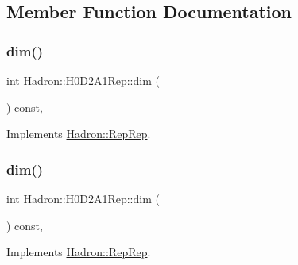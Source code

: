 \subsection{Member Function Documentation}
\mbox{\label{structHadron_1_1H0D2A1Rep_ab42f651512c7614de1f9eda51cfa51be}} 
\subsubsection{\texorpdfstring{dim()}{dim()}\hspace{0.1cm}{\footnotesize\ttfamily [1/5]}}
{\footnotesize\ttfamily int Hadron\+::\+H0\+D2\+A1\+Rep\+::dim (\begin{DoxyParamCaption}{ }\end{DoxyParamCaption}) const\hspace{0.3cm}{\ttfamily [inline]}, {\ttfamily [virtual]}}



Implements \mbox{\hyperlink{structHadron_1_1RepRep_a92c8802e5ed7afd7da43ccfd5b7cd92b}{Hadron\+::\+Rep\+Rep}}.

\mbox{\label{structHadron_1_1H0D2A1Rep_ab42f651512c7614de1f9eda51cfa51be}} 
\subsubsection{\texorpdfstring{dim()}{dim()}\hspace{0.1cm}{\footnotesize\ttfamily [2/5]}}
{\footnotesize\ttfamily int Hadron\+::\+H0\+D2\+A1\+Rep\+::dim (\begin{DoxyParamCaption}{ }\end{DoxyParamCaption}) const\hspace{0.3cm}{\ttfamily [inline]}, {\ttfamily [virtual]}}



Implements \mbox{\hyperlink{structHadron_1_1RepRep_a92c8802e5ed7afd7da43ccfd5b7cd92b}{Hadron\+::\+Rep\+Rep}}.

\mbox{\label{structHadron_1_1H0D2A1Rep_ab42f651512c7614de1f9eda51cfa51be}} 
